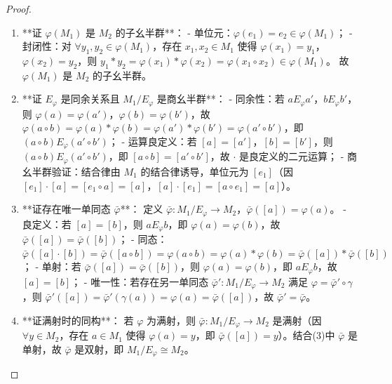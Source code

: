 \documentclass[oneside]{book}
\theoremstyle{definition}
\begin{document}
\begin{proof}
	\begin{enumerate}
		\item **证 \( \varphi(M_1) \) 是 \( M_2 \) 的子幺半群**：
		- 单位元：\( \varphi(e_1) = e_2 \in \varphi(M_1) \)；
		- 封闭性：对 \( \forall y_1, y_2 \in \varphi(M_1) \)，存在 \( x_1, x_2 \in M_1 \) 使得 \( \varphi(x_1) = y_1 \)，\( \varphi(x_2) = y_2 \)，则 \( y_1 * y_2 = \varphi(x_1) * \varphi(x_2) = \varphi(x_1 \circ x_2) \in \varphi(M_1) \)。
		故 \( \varphi(M_1) \) 是 \( M_2 \) 的子幺半群。
		
		\item **证 \( E_\varphi \) 是同余关系且 \( M_1/E_\varphi \) 是商幺半群**：
		- 同余性：若 \( aE_\varphi a' \)，\( bE_\varphi b' \)，则 \( \varphi(a) = \varphi(a') \)，\( \varphi(b) = \varphi(b') \)，故 \( \varphi(a \circ b) = \varphi(a) * \varphi(b) = \varphi(a') * \varphi(b') = \varphi(a' \circ b') \)，即 \( (a \circ b)E_\varphi (a' \circ b') \)；
		- 运算良定义：若 \( [a] = [a'] \)，\( [b] = [b'] \)，则 \( (a \circ b)E_\varphi (a' \circ b') \)，即 \( [a \circ b] = [a' \circ b'] \)，故 \( \cdot \) 是良定义的二元运算；
		- 商幺半群验证：结合律由 \( M_1 \) 的结合律诱导，单位元为 \( [e_1] \)（因 \( [e_1] \cdot [a] = [e_1 \circ a] = [a] \)，\( [a] \cdot [e_1] = [a \circ e_1] = [a] \)）。
		
		\item **证存在唯一单同态 \( \bar{\varphi} \)**：
		定义 \( \bar{\varphi}: M_1/E_\varphi \to M_2 \)，\( \bar{\varphi}([a]) = \varphi(a) \)。
		- 良定义：若 \( [a] = [b] \)，则 \( aE_\varphi b \)，即 \( \varphi(a) = \varphi(b) \)，故 \( \bar{\varphi}([a]) = \bar{\varphi}([b]) \)；
		- 同态：\( \bar{\varphi}([a] \cdot [b]) = \bar{\varphi}([a \circ b]) = \varphi(a \circ b) = \varphi(a) * \varphi(b) = \bar{\varphi}([a]) * \bar{\varphi}([b]) \)；
		- 单射：若 \( \bar{\varphi}([a]) = \bar{\varphi}([b]) \)，则 \( \varphi(a) = \varphi(b) \)，即 \( aE_\varphi b \)，故 \( [a] = [b] \)；
		- 唯一性：若存在另一单同态 \( \bar{\varphi}': M_1/E_\varphi \to M_2 \) 满足 \( \varphi = \bar{\varphi}' \circ \gamma \)，则 \( \bar{\varphi}'([a]) = \bar{\varphi}'(\gamma(a)) = \varphi(a) = \bar{\varphi}([a]) \)，故 \( \bar{\varphi}' = \bar{\varphi} \)。
		
		\item **证满射时的同构**：
		若 \( \varphi \) 为满射，则 \( \bar{\varphi}: M_1/E_\varphi \to M_2 \) 是满射（因 \( \forall y \in M_2 \)，存在 \( a \in M_1 \) 使得 \( \varphi(a) = y \)，即 \( \bar{\varphi}([a]) = y \)）。结合(3)中 \( \bar{\varphi} \) 是单射，故 \( \bar{\varphi} \) 是双射，即 \( M_1/E_\varphi \cong M_2 \)。
	\end{enumerate}
\end{proof}
\end{document}
